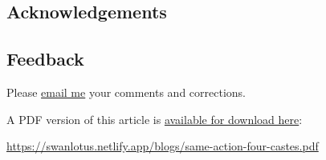 \documentclass[
  a4paper,
]{article}
\begin{document}
\subsection{Acknowledgements}\label{acknowledgements}

\subsection{Feedback}\label{feedback}

Please \href{mailto:feedback.swanlotus@gmail.com}{email me} your
comments and corrections.

\noindent A PDF version of this article is
\href{./same-action-four-castes.pdf}{available for download here}:

\begin{small}

\begin{sffamily}

\url{https://swanlotus.netlify.app/blogs/same-action-four-castes.pdf}

\end{sffamily}

\end{small}
\end{document}
